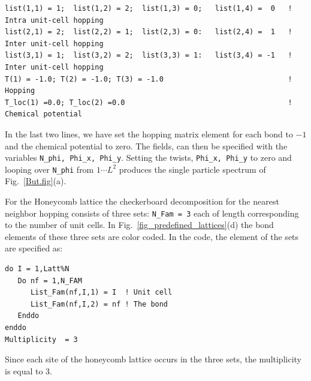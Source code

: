 \begin{lstlisting}[style=fortran]
list(1,1) = 1;  list(1,2) = 2;  list(1,3) = 0;   list(1,4) =  0   ! Intra unit-cell hopping
list(2,1) = 2;  list(2,2) = 1;  list(2,3) = 0:   list(2,4) =  1   ! Inter unit-cell hopping
list(3,1) = 1;  list(3,2) = 2;  list(3,3) = 1:   list(3,4) = -1   ! Inter unit-cell hopping
T(1) = -1.0; T(2) = -1.0; T(3) = -1.0                             ! Hopping
T_loc(1) =0.0; T_loc(2) =0.0                                      ! Chemical potential 
\end{lstlisting} 
In the last two lines, we have set the hopping matrix element  for each bond to $-1$  and the chemical potential to zero.    The fields,   can then be specified   with the  variables   \texttt{N\_phi, Phi\_x, Phi\_y}.  Setting   the twists, 
 \texttt{Phi\_x, Phi\_y}  to zero and  looping over \texttt{N\_phi}    from $ 1 \cdots L^2 $   produces  the single particle spectrum of  Fig.~\ref{But.fig}(a).  
 
 For the Honeycomb lattice  the checkerboard decomposition  for the nearest neighbor hopping consists of three  sets:  \texttt{N\_Fam = 3}  each of length   corresponding  to the number of unit cells.  In  Fig.~\ref{fig_predefined_lattices}(d)  
 the bond elements of these three sets are color coded.  In the code,   the element of the sets  are specified as:
 
\begin{lstlisting}[style=fortran] 
do I = 1,Latt%N
   Do nf = 1,N_FAM
      List_Fam(nf,I,1) = I  ! Unit cell
      List_Fam(nf,I,2) = nf ! The bond 
   Enddo
enddo
Multiplicity  = 3
\end{lstlisting}        
Since each site of the honeycomb lattice occurs in  the three sets,  the multiplicity is equal to 3.  



